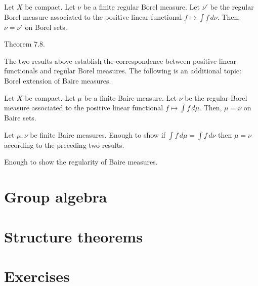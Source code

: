 \documentclass{../../large}
\begin{document}
\begin{prb}
Let $X$ be compact.
Let $\nu$ be a finite regular Borel measure.
Let $\nu'$ be the regular Borel measure associated to the positive linear functional $f\mapsto\int f\,d\nu$.
Then, $\nu=\nu'$ on Borel sets.
\end{prb}
\begin{sol}
Theorem 7.8.
\end{sol}

The two results above establish the correspondence between positive linear functionals and regular Borel measures.
The following is an additional topic: Borel extension of Baire measures.
\begin{prb}
Let $X$ be compact.
Let $\mu$ be a finite Baire measure.
Let $\nu$ be the regular Borel measure associated to the positive linear functional $f\mapsto\int f\,d\mu$.
Then, $\mu=\nu$ on Baire sets.
\end{prb}
\begin{sol}
Let $\mu,\nu$ be finite Baire measures.
Enough to show if $\int f\,d\mu=\int f\,d\nu$ then $\mu=\nu$ according to the preceding two results.

Enough to show the regularity of Baire measures.
\end{sol}






\section{Group algebra}
\begin{prb}
\end{prb}
\begin{prb}[Convolution]
\end{prb}

\section{Structure theorems}

\section*{Exercises}
\begin{prb}
\end{prb}
\end{document}

